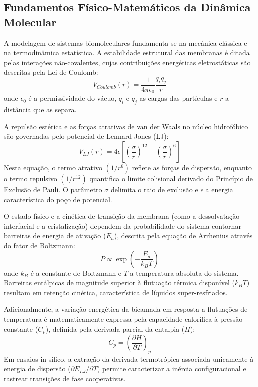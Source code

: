 \subsection{Fundamentos Físico-Matemáticos da Dinâmica Molecular}

A modelagem de sistemas biomoleculares fundamenta-se na mecânica clássica e na termodinâmica estatística. A estabilidade estrutural das membranas é ditada pelas interações não-covalentes, cujas contribuições energéticas eletrostáticas são descritas pela Lei de Coulomb:
\begin{equation}
    V_{Coulomb}(r) = \frac{1}{4\pi\epsilon_0}\frac{q_i q_j}{r}
\end{equation}
onde $\epsilon_0$ é a permissividade do vácuo, $q_i$ e $q_j$ as cargas das partículas e $r$ a distância que as separa.

A repulsão estérica e as forças atrativas de van der Waals no núcleo hidrofóbico são governadas pelo potencial de Lennard-Jones (LJ):
\begin{equation}
    V_{LJ}(r) = 4\epsilon \left[ \left(\frac{\sigma}{r}\right)^{12} - \left(\frac{\sigma}{r}\right)^6 \right]
\end{equation}
Nesta equação, o termo atrativo $(1/r^6)$ reflete as forças de dispersão, enquanto o termo repulsivo $(1/r^{12})$ quantifica o limite colisional derivado do Princípio de Exclusão de Pauli. O parâmetro $\sigma$ delimita o raio de exclusão e $\epsilon$ a energia característica do poço de potencial.

O estado físico e a cinética de transição da membrana (como a dessolvatação interfacial e a cristalização) dependem da probabilidade do sistema contornar barreiras de energia de ativação ($E_a$), descrita pela equação de Arrhenius através do fator de Boltzmann:
\begin{equation}
    P \propto \exp\left(-\frac{E_a}{k_B T}\right)
\end{equation}
onde $k_B$ é a constante de Boltzmann e $T$ a temperatura absoluta do sistema. Barreiras entálpicas de magnitude superior à flutuação térmica disponível ($k_B T$) resultam em retenção cinética, característica de líquidos super-resfriados.

Adicionalmente, a variação energética da bicamada em resposta a flutuações de temperatura é matematicamente expressa pela capacidade calorífica à pressão constante ($C_p$), definida pela derivada parcial da entalpia ($H$):
\begin{equation}
    C_p = \left(\frac{\partial H}{\partial T}\right)_p
\end{equation}
Em ensaios in silico, a extração da derivada termotrópica associada unicamente à energia de dispersão ($\partial E_{LJ}/\partial T$) permite caracterizar a inércia configuracional e rastrear transições de fase cooperativas.

